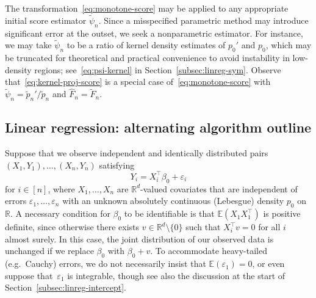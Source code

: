 \documentclass[a4paper]{article}
\newcommand{\R}{\mathbb{R}}
\newcommand{\E}{\mathbb{E}}
\theoremstyle{definition}
\begin{document}
The transformation~\eqref{eq:monotone-score} may be applied to any appropriate initial score estimator $\tilde{\psi}_n$. Since a misspecified parametric method may introduce significant error at the outset, we seek a nonparametric estimator. For instance, we may take $\tilde{\psi}_n$ to be a ratio of kernel density estimates of $p_0'$ and $p_0$, which may be truncated for theoretical and practical convenience to avoid instability in low-density regions; see~\eqref{eq:psi-kernel} in Section~\ref{subsec:linreg-sym}. Observe that~\eqref{eq:kernel-proj-score} is a special case of~\eqref{eq:monotone-score} with $\tilde{\psi}_n = \tilde{p}_n'/\tilde{p}_n$ and $\hat{F}_n = \tilde{F}_n$.

\subsection{Linear regression: alternating algorithm outline}
\label{subsec:lin_reg_id_alt}

Suppose that we observe independent and identically distributed pairs $(X_1,Y_1),\dotsc,(X_n,Y_n)$ satisfying
\begin{equation}
\label{eq:linear-model}
Y_i = X_i^\top\beta_0 + \varepsilon_i
\end{equation}
for $i \in [n]$, where $X_1,\dotsc,X_n$ are $\R^d$-valued covariates that are independent of errors $\varepsilon_1,\dotsc,\varepsilon_n$ with an unknown absolutely continuous (Lebesgue) density $p_0$ on $\R$. A necessary condition for $\beta_0$ to be identifiable is that $\E(X_1 X_1^\top)$ is positive definite, since otherwise there exists $v \in \R^d \setminus \{0\}$ such that $X_i^\top v = 0$ for all $i$ almost surely. In this case, the joint distribution of our observed data is unchanged if we replace $\beta_0$ with $\beta_0 + v$. To accommodate heavy-tailed (e.g.~Cauchy) errors, we do not necessarily insist that $\E(\varepsilon_1) = 0$, or even suppose that~$\varepsilon_1$ is integrable, though see also the discussion at the start of Section~\ref{subsec:linreg-intercept}.
\end{document}
